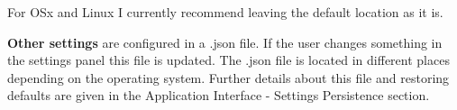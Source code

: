 For OSx and Linux I currently recommend leaving the default location as it is.

\textbf{Other settings} are configured in a .json file. If the user changes something in the settings panel this file is updated. The .json file is located in different places depending on the operating system. Further details about this file and restoring defaults are given in the  Application Interface - Settings Persistence section.

\pagebreak